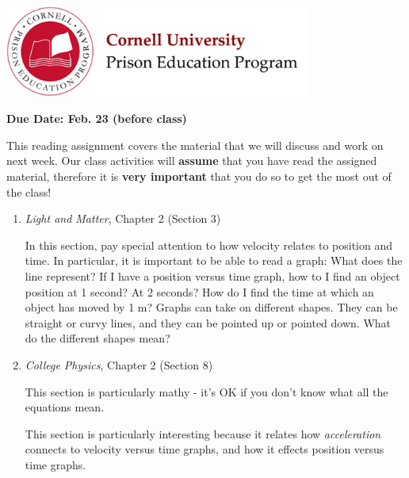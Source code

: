 \documentclass[addpoints,12pt]{exam}
\begin{document}

\begin{flushright}
\vspace{0.2in}

\end{flushright}

\begin{center}
\includegraphics[width=10cm]{../images/logo.png}
\end{center}

\begin{center}
\end{center}

\noindent\begin{large}\textbf{Due Date: Feb. 23 (before class)}\end{large}
\vspace{0.2in}

This reading assignment covers the material that we will discuss and work on next week. Our class activities will \textbf{assume} that you have read the assigned material, therefore it is \textbf{very important} that you do so to get the most out of the class!
\begin{enumerate}
	\item \textit{Light and Matter}, Chapter 2 (Section 3)
	
	In this section, pay special attention to how velocity relates to position and time. In particular, it is important to be able to read a graph: What does the line represent? If I have a position versus time graph, how to I find an object position at 1 second? At 2 seconds? How do I find the time at which an object has moved by 1 m?
	Graphs can take on different shapes. They can be straight or curvy lines, and they can be pointed up or pointed down. What do the different shapes mean?
	
	
	\item \textit{College Physics}, Chapter 2 (Section 8)
	
	This section is particularly mathy - it's OK if you don't know what all the equations mean.
	
	This section is particularly interesting because it relates how \textit{acceleration} connects to velocity versus time graphs, and how it effects position versus time graphs.
	
	
	
\end{enumerate}
\end{document}
